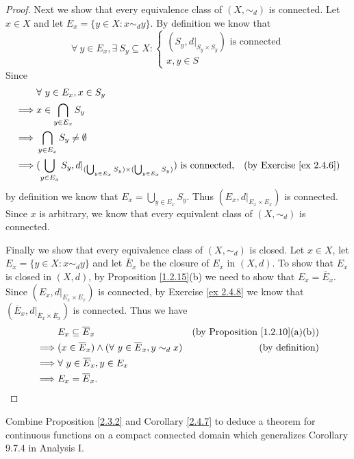 \begin{proof}
    Next we show that every equivalence class of \((X, \sim_d)\) is connected.
    Let \(x \in X\) and let \(E_x = \{y \in X : x \sim_d y\}\).
    By definition we know that
    \[
        \forall\ y \in E_x, \exists\ S_y \subseteq X : \begin{cases}
            (S_y, d|_{S_y \times S_y}) \text{ is connected} \\
            x, y \in S
        \end{cases}
    \]
    Since
    \begin{align*}
                 & \forall\ y \in E_x, x \in S_y                                                                                                                          \\
        \implies & x \in \bigcap_{y \in E_x} S_y                                                                                                                          \\
        \implies & \bigcap_{y \in E_x} S_y \neq \emptyset                                                                                                                 \\
        \implies & (\bigcup_{y \in E_x} S_y, d|_{(\bigcup_{y \in E_x} S_y) \times (\bigcup_{y \in E_x} S_y)}) \text{ is connected}, & \text{(by Exercise \ref{ex 2.4.6})}
    \end{align*}
    by definition we know that \(E_x = \bigcup_{y \in E_x} S_y\).
    Thus \((E_x, d|_{E_x \times E_x})\) is connected.
    Since \(x\) is arbitrary, we know that every equivalent class of \((X, \sim_d)\) is connected.

    Finally we show that every equivalence class of \((X, \sim_d)\) is closed.
    Let \(x \in X\), let \(E_x = \{y \in X : x \sim_d y\}\) and let \(\overline{E}_x\) be the closure of \(E_x\) in \((X, d)\).
    To show that \(E_x\) is closed in \((X, d)\), by Proposition \ref{1.2.15}(b) we need to show that \(E_x = \overline{E}_x\).
    Since \((E_x, d|_{E_x \times E_x})\) is connected, by Exercise \ref{ex 2.4.8} we know that \((\overline{E}_x, d|_{\overline{E}_x \times \overline{E}_x})\) is connected.
    Thus we have
    \begin{align*}
                 & E_x \subseteq \overline{E}_x                                             & \text{(by Proposition \ref{1.2.10}(a)(b))} \\
        \implies & (x \in \overline{E}_x) \land (\forall\ y \in \overline{E}_x, y \sim_d x) & \text{(by definition)}                     \\
        \implies & \forall\ y \in \overline{E}_x, y \in E_x                                                                              \\
        \implies & E_x = \overline{E}_x.
    \end{align*}
\end{proof}

\begin{exercise}\label{ex 2.4.10}
    Combine Proposition \ref{2.3.2} and Corollary \ref{2.4.7} to deduce a theorem for continuous functions on a compact connected domain which generalizes Corollary 9.7.4 in Analysis I.
\end{exercise}